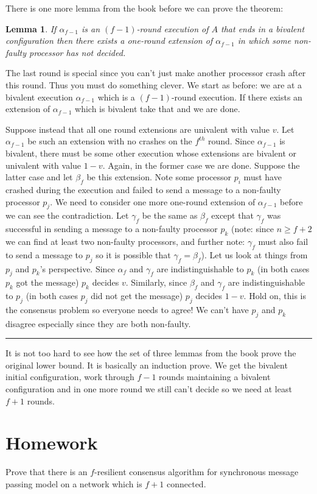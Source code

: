 \documentclass[twoside]{article}
\newtheorem{lemma}[theorem]{Lemma}
\newenvironment{proof}{{\bf Proof:}}{\hfill\rule{2mm}{2mm}}
\begin{document}
There is one more lemma from the book before we can prove the theorem:
\begin{lemma}
If $\alpha_{f-1}$ is an $(f-1)$-round execution of $A$ that ends in a bivalent configuration then there exists a one-round extension of $\alpha_{f-1}$ in which some non-faulty processor has not decided.
\end{lemma}
\begin{proof}
The last round is special since you can't just make another processor crash after this round. Thus you must do something clever. We start as before: we are at a bivalent execution $\alpha_{f-1}$ which is a $(f-1)$-round execution. If there exists an extension of $\alpha_{f-1}$ which is bivalent take that and we are done. 

Suppose instead that all one round extensions are univalent with value $v$. Let $\alpha_{f-1}$ be such an extension with no crashes on the $f^{th}$ round. Since $\alpha_{f-1}$ is bivalent, there must be some other execution whose extensions are bivalent or univalent with value $1-v$. Again, in the former case we are done. Suppose the latter case and let $\beta_f$ be this extension. Note some processor $p_i$ must have crashed during the execution and failed to send a message to a non-faulty processor $p_j$. We need to consider one more one-round extension of $\alpha_{f-1}$ before we can see the contradiction. Let $\gamma_f$ be the same as $\beta_f$ except that $\gamma_f$ was successful in sending a message to a non-faulty processor $p_k$ (note: since $n \geq f+2$ we can find at least two non-faulty processors, and further note: $\gamma_f$ must also fail to send a message to $p_j$ so it is possible that $\gamma_f = \beta_f$). Let us look at things from $p_j$ and $p_k$'s perspective. Since $\alpha_f$ and $\gamma_f$ are indistinguishable to $p_k$ (in both cases  $p_k$ got the message) $p_k$ decides $v$. Similarly, since $\beta_f$ and $\gamma_f$ are indistinguishable to $p_j$ (in both cases $p_j$ did not get the message) $p_j$ decides $1-v$. Hold on, this is the consensus problem so everyone needs to agree! We can't have $p_j$ and $p_k$ disagree especially since they are both non-faulty. 
\end{proof}

It is not too hard to see how the set of three lemmas from the book prove the original lower bound. It is basically an induction prove. We get the bivalent initial configuration, work through $f-1$ rounds maintaining a bivalent configuration and in one more round we still can't decide so we need at least $f+1$ rounds.

\section{Homework}
Prove that there is an $f$-resilient consensus algorithm for synchronous message passing model on a network which is $f+1$ connected.  
\end{document}
